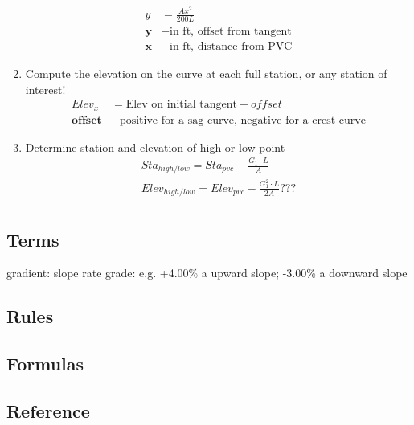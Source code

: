 \documentclass{article}
\begin{document}
\begin{enumerate}
\begin{align*}
        y & = \frac{Ax^2}{200L} \\
        \textbf{y} & - \text{in ft, offset from tangent} \\
        \textbf{x} & - \text{in ft, distance from PVC} 
      \end{align*}
      \item Compute the elevation on the curve at each full station, or any station of interest!
      \begin{align*}
        Elev_x & = \text{Elev on initial tangent} + offset \\
        \textbf{offset} & - \text{positive for a sag curve, negative for a crest curve}
      \end{align*}
      \item Determine station and elevation of high or low point
      \begin{align*}
        Sta_{high/low} = Sta_{pvc} - \frac{G_1 \cdot L}{A} \\
        Elev_{high/low} = Elev_{pvc} - \frac{G_1 ^ 2 \cdot L}{2A}  \textbf{???}\\
      \end{align*}
    \end{enumerate}


  \subsection{Terms}
  gradient: slope rate
  grade: e.g. +4.00\% a upward slope; -3.00\% a downward slope

  \subsection{Rules}

  \subsection{Formulas}

  \subsection{Reference}

  \newpage
\end{document}
